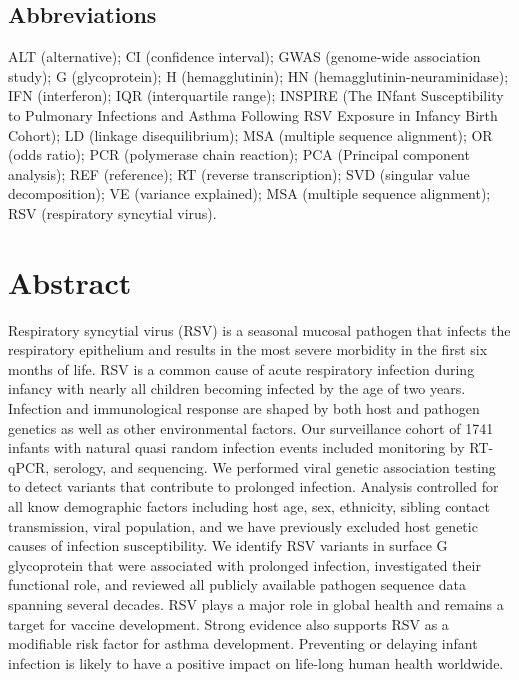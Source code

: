 \documentclass{article} %
\begin{document}

\clearpage
\subsection*{Abbreviations}
ALT (alternative);
CI (confidence interval);
GWAS (genome-wide association study);
G (glycoprotein);
H (hemagglutinin);
HN (hemagglutinin-neuraminidase);
IFN (interferon);
IQR (interquartile range);
INSPIRE (The INfant Susceptibility to Pulmonary Infections and Asthma Following RSV Exposure in Infancy Birth Cohort);
LD (linkage disequilibrium);
MSA (multiple sequence alignment);
OR (odds ratio);
PCR (polymerase chain reaction);
PCA (Principal component analysis);
REF (reference);
RT (reverse transcription);
SVD (singular value decomposition);
VE (variance explained);
MSA (multiple sequence alignment);
RSV (respiratory syncytial virus).

\section{Abstract}
Respiratory syncytial virus (RSV) is a seasonal mucosal pathogen that infects the respiratory epithelium and results in the most severe morbidity in the first six months of life. 
RSV is a common cause of acute respiratory infection during infancy with nearly all children becoming infected by the age of two years.
Infection and immunological response are shaped by both host and pathogen genetics as well as other environmental factors. 
Our surveillance cohort of 1741 infants with
natural quasi random infection events included monitoring by RT-qPCR, serology, and sequencing. 
We performed viral genetic association testing to detect variants that contribute to prolonged infection.
Analysis controlled for all know demographic factors including host age, sex, ethnicity, sibling contact transmission, viral population, and we have previously excluded host genetic causes of infection susceptibility.
We identify RSV variants in surface G glycoprotein that were associated with prolonged infection, investigated their functional role, and reviewed all publicly available pathogen sequence data spanning several decades. 
RSV plays a major role in global health and remains a target for vaccine development.
Strong evidence also supports RSV as a modifiable risk factor for asthma development. Preventing or delaying infant infection is likely to have a positive impact on life-long human health worldwide.
\end{document}
